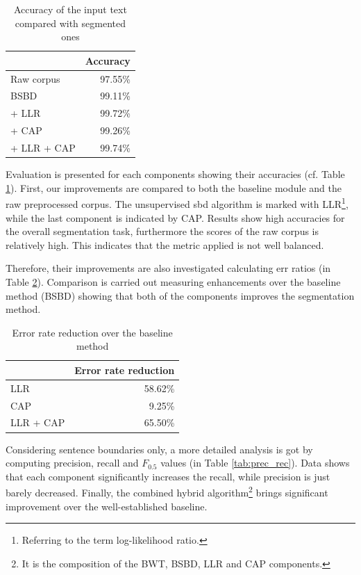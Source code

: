 \begin{table}[H]
\centering
\caption{Accuracy of the input text compared with segmented ones}
\label{tab:base}
\begin{tabular}{ l  r } 
\hline
& Accuracy \\ 
\hline
Raw corpus  & 97.55\% \\
BSBD & 99.11\% \\
\hspace{0.2cm}+ LLR & 99.72\% \\
\hspace{0.2cm}+ CAP & 99.26\% \\
\hspace{0.2cm}+ LLR + CAP & 99.74\% \\
\hline
\end{tabular}
\end{table}

Evaluation is presented for each components showing their accuracies (cf. Table \ref{tab:base}).
First, our improvements are compared to both the baseline module and the raw preprocessed corpus.
The unsupervised \acrshort{sbd} algorithm is marked with LLR\footnote{Referring to the term log-likelihood ratio.}, while the last component is indicated by CAP.
Results show high accuracies for the overall segmentation task, furthermore the scores of the raw corpus is relatively high.
This indicates that the metric applied is not well balanced.

Therefore, their improvements are also investigated calculating \acrlong{err} ratios (in Table \ref{tab:reduction}). 
Comparison is carried out measuring enhancements over the baseline method (BSBD) showing that both of the components improves the segmentation method.

\begin{table}[H]
\centering
\caption{Error rate reduction over the baseline method}
\label{tab:reduction}
\begin{tabular}{ l  r } 
\hline
& Error rate reduction\\
\hline
LLR & 58.62\% \\
CAP & 9.25\% \\
LLR + CAP & 65.50\% \\
\hline
\end{tabular}
\end{table}

Considering sentence boundaries only, a more detailed analysis is got by computing precision, recall and $F_{0.5}$ values (in Table \ref{tab:prec_rec}). 
Data shows that each component significantly increases the recall, while precision is just barely decreased. 
Finally, the combined hybrid algorithm\footnote{It is the composition of the BWT, BSBD, LLR and CAP components.} brings significant improvement over the well-established baseline.

